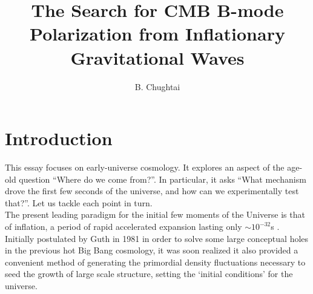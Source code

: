 \documentclass[a4paper,10pt]{article}
\title{\boldmath The Search for CMB B-mode Polarization from Inflationary Gravitational Waves}
\author{B. Chughtai}
\affiliation{University of Cambridge, Cambridge, UK}
\begin{document}
\maketitle
\flushbottom





\section{Introduction}


This essay focuses on early-universe cosmology. It explores an aspect of the age-old question ``Where do we come from?''. In particular, it asks ``What mechanism drove the first few seconds of the universe, and how can we experimentally test that?''. Let us tackle each point in turn.\\

The present leading paradigm for the initial few moments of the Universe is that of inflation, a period of rapid accelerated expansion lasting only $\sim10^{-32}$s . Initially postulated by Guth in 1981 \cite{Guth} in order to solve some large conceptual holes in the previous hot Big Bang cosmology, it was soon realized it also provided a convenient method of generating the primordial density fluctuations necessary to seed the growth of large scale structure, setting the `initial conditions' for the universe. \\
\end{document}
